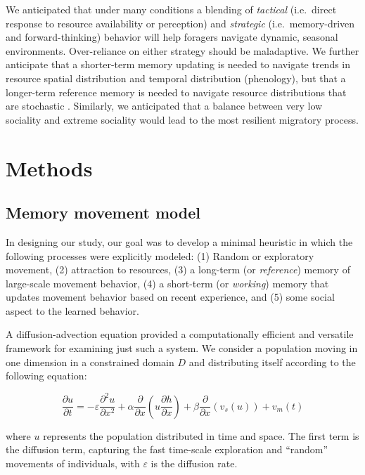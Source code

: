 \documentclass[utf8]{frontiersSCNS} %
\begin{document}
We anticipated that under many conditions a blending of \emph{tactical} (i.e.~direct response to resource availability or perception) and \emph{strategic} (i.e.~memory-driven and forward-thinking) behavior will help foragers navigate dynamic, seasonal environments. Over-reliance on either strategy should be maladaptive. We further anticipate that a shorter-term memory updating is needed to navigate trends in resource spatial distribution and temporal distribution (phenology), but that a longer-term reference memory is needed to navigate resource distributions that are stochastic \citep{Lin2021}.  Similarly, we anticipated that a balance between very low sociality and extreme sociality would lead to the most resilient migratory process. 

\section{Methods}

\subsection{Memory movement model}

In designing our study, our goal was to develop a minimal heuristic in which the following processes were explicitly modeled: (1) Random or exploratory movement, (2) attraction to resources, (3) a long-term (or \emph{reference}) memory of large-scale movement behavior, (4) a short-term (or \emph{working}) memory that updates movement behavior based on recent experience, and (5) some social aspect to the learned behavior.

A diffusion-advection equation provided a computationally efficient and versatile framework for examining just such a system. We consider a population moving in one dimension in a constrained domain $D$ and distributing itself according to the following equation:

\begin{equation}\label{eq_mainmodel}
	{\frac{\partial u}{\partial t}} = -\varepsilon {\frac{\partial^2 u}{\partial x^2}} + 
	\alpha \frac{\partial}{\partial x}\left(u \frac{\partial h}{\partial x}\right) + 
	\beta \frac{\partial}{\partial x}\left(v_s(u)\right) + 
	v_m(t)
\end{equation}

\noindent where $u$ represents the population distributed in time and space. The first term is the diffusion term, capturing the fast time-scale exploration and ``random'' movements of individuals, with $\varepsilon$ is the diffusion rate.
\end{document}
